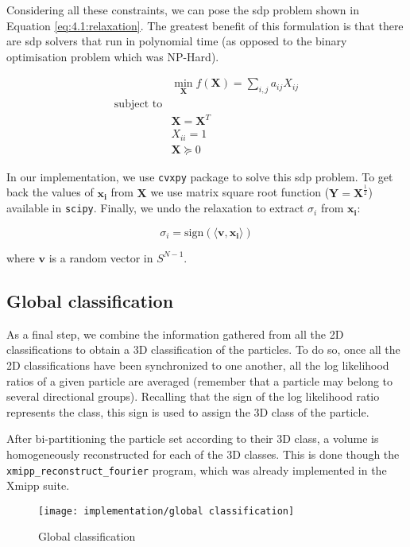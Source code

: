 \documentclass[../main.tex]{subfiles}
\begin{document}
Considering all these constraints, we can pose the \gls{sdp} problem shown in Equation \eqref{eq:4.1:relaxation}. The greatest benefit of this formulation is that there are \gls{sdp} solvers that run in polynomial time (as opposed to the binary optimisation problem which was NP-Hard).

\begin{equation}\label{eq:4.1:relaxation}
\begin{aligned}
    & \min_{\bm{X}} f(\bm{X}) = \sum_{i,j} a_{ij}X_{ij}\\
    \text{subject to}\\
    & \bm{X} = \bm{X}^T\\
    & X_{ii} = 1\\
    & \bm{X} \succeq 0
\end{aligned}
\end{equation}

In our implementation, we use \texttt{cvxpy}\cite{agrawal2018}\cite{diamond2016} package to solve this \gls{sdp} problem. To get back the values of $\bm{x_i}$ from $\bm{X}$ we use matrix square root function ($\bm{Y} = \bm{X}^\frac{1}{2}$) available in \texttt{scipy}\cite{virtanen2020}. Finally, we undo the relaxation to extract $\sigma_i$ from $\bm{x_i}$\cite{kemal2008}:

\begin{equation}
    \sigma_i = \text{sign}(\langle \bm{v}, \bm{x_i} \rangle)
\end{equation}

where $\bm{v}$ is a random vector in $S^{N-1}$.

\subsection{Global classification}
As a final step, we combine the information gathered from all the 2D classifications to obtain a 3D classification of the particles. To do so, once all the 2D classifications have been synchronized to one another, all the log likelihood ratios of a given particle are averaged (remember that a particle may belong to several directional groups). Recalling that the sign of the log likelihood ratio represents the class, this sign is used to assign the 3D class of the particle.

After bi-partitioning the particle set according to their 3D class, a volume is homogeneously reconstructed for each of the 3D classes. This is done though the \texttt{xmipp\_reconstruct\_fourier} program, which was already implemented in the Xmipp suite\cite{strelak2019}.

\begin{figure}
    \centering
    \texttt{[image: implementation/global classification]}
    \caption{Global classification}
    \label{fig:4.1:global}
\end{figure}
\end{document}
